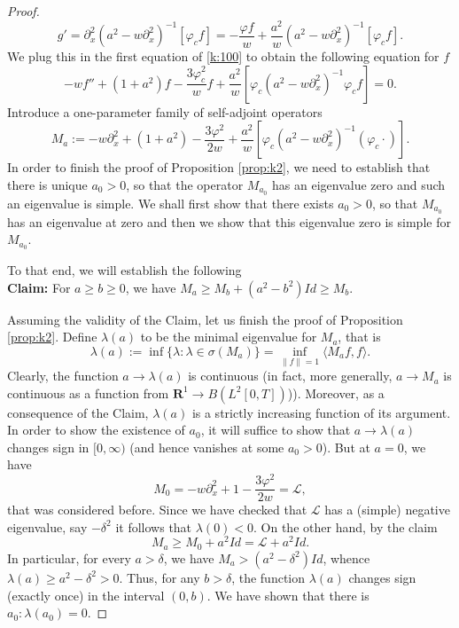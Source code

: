 \documentclass[final,11pt,leqno]{amsart}
\begin{document}
\begin{proof}
$$
g'={\partial}_x^2 (a^2-w {\partial}_x^2)^{-1} [{\varphi}_c f]= -{\frac{{{\varphi} f}}{{w}}} +{\frac{{a^2}}{{w}}} (a^2-w {\partial}_x^2)^{-1} [{\varphi}_c f].
$$
We plug this in the first equation of \eqref{k:100} to obtain the following equation for $f$
\begin{equation}
\label{k:120}
-w f''+(1+a^2) f-{\frac{{3{\varphi}_c^2}}{{w}}} f+{\frac{{a^2}}{{w}}}[{\varphi}_c (a^2-w {\partial}_x^2)^{-1} {\varphi}_c f] =0.
\end{equation}
Introduce a one-parameter family of self-adjoint operators
$$
M_a:=-w{\partial}_x^2+(1+a^2) - {\frac{{3{\varphi}^2}}{{2w}}}+{\frac{{a^2}}{{w}}}[{\varphi}_c (a^2-w {\partial}_x^2)^{-1} ({\varphi}_c\cdot)].
$$
In order to finish the proof of Proposition \ref{prop:k2}, we need to establish that there is unique $a_0>0$, so that the operator $M_{a_0}$
has an eigenvalue zero and such an eigenvalue is simple. We shall first show that there exists $a_0>0$, so that $M_{a_0}$ has an eigenvalue at
zero and then we show that this eigenvalue zero is simple for $M_{a_0}$.

To that end,  we will establish the following \\
{\bf Claim:} For $a\geq b\geq 0$, we have $M_a\geq M_b+(a^2-b^2)Id\geq M_b$.

Assuming the validity of the Claim, let us finish the proof of Proposition
\ref{prop:k2}.   Define ${\lambda}(a)$ to be the minimal eigenvalue for $M_a$, that is
$$
{\lambda}(a):=\inf\{{\lambda}: {\lambda} \in {\sigma}(M_a)\}=\inf_{\|f\|=1} {\langle {M_a f},{f} \rangle}.
$$
Clearly, the function $a\to {\lambda}(a)$ is continuous (in fact, more generally,  $a\to M_a$ is continuous as a function from ${\mathbf R^1} \to B(L^2[0,T])$)).
Moreover, as a consequence of the Claim, ${\lambda}(a)$ is a strictly increasing function of its argument. In order to show the existence of $a_0$,
it will suffice to show that $a\to {\lambda}(a)$ changes sign in
$[0, \infty)$ (and hence vanishes at some $a_0>0$).  But at $a=0$, we have
$$
M_0=-w {\partial}_x^2+1-{\frac{{3{\varphi}^2}}{{2 w}}}={\mathcal L},
$$
that was considered before. Since we have checked that ${\mathcal L}$ has a (simple) negative eigenvalue, say $-{\delta}^2$ it follows that ${\lambda}(0)<0$.
On the other hand, by the claim
$$
M_a\geq M_0+a^2 Id={\mathcal L}+a^2 Id.
$$
In particular, for every $a>{\delta}$, we have $M_a>(a^2-{\delta}^2) Id$, whence ${\lambda}(a)\geq a^2-{\delta}^2>0$. Thus, for any $b>{\delta}$, the function ${\lambda}(a)$
changes sign (exactly once) in the interval $(0,b)$. We have shown that there is $a_0: {\lambda}(a_0)=0$.


\end{proof}
\end{document}
